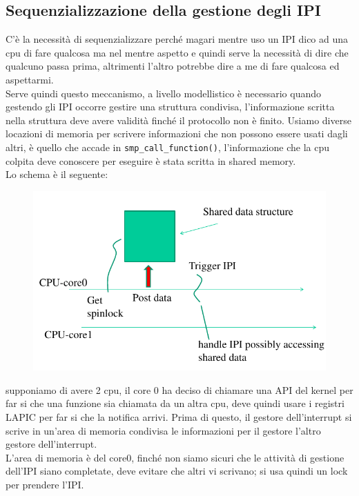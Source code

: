 \documentclass[12pt, oneside]{extbook}
\begin{document}
\subsection{Sequenzializzazione della gestione degli IPI}
C'è la necessità di sequenzializzare perché magari mentre uso un IPI dico ad una cpu di fare qualcosa ma nel mentre aspetto e quindi serve la necessità di dire che qualcuno passa prima, altrimenti l'altro potrebbe dire a me di fare qualcosa ed aspettarmi.\\Serve quindi questo meccanismo, a livello modellistico è necessario quando gestendo gli IPI occorre gestire una struttura condivisa, l'informazione scritta nella struttura deve avere validità finché il protocollo non è finito. Usiamo diverse locazioni di memoria per scrivere informazioni che non possono essere usati dagli altri, è quello che accade in \texttt{smp\_call\_function()}, l'informazione che la cpu colpita deve conoscere per eseguire è stata scritta in shared memory.\\ Lo schema è il seguente:
\begin{figure}[!h]
	\includegraphics[scale=0.4]{immagini/ipi_sequentialization.png}
\end{figure}
supponiamo di avere 2 cpu, il core 0 ha deciso di chiamare una API del kernel per far si che una funzione sia chiamata da un altra cpu, deve quindi usare i registri LAPIC per far si che la notifica arrivi. Prima di questo, il gestore dell'interrupt si scrive in un'area di memoria condivisa le informazioni per il gestore l'altro gestore dell'interrupt.\\L'area di memoria è del core0, finché non siamo sicuri che le attività di gestione dell'IPI siano completate, deve evitare che altri vi scrivano; si usa quindi un lock per prendere l'IPI.
\end{document}
